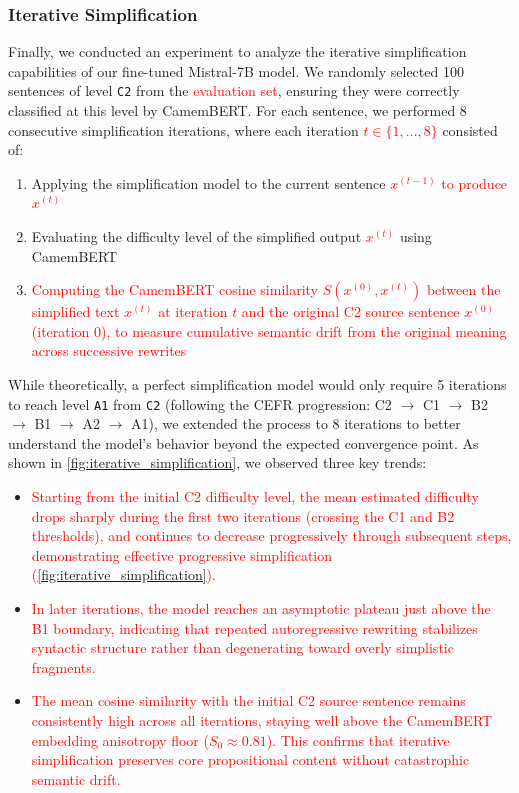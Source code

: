 \subsubsection{Iterative Simplification}

Finally, we conducted an experiment to analyze the iterative simplification capabilities of our fine-tuned Mistral-7B model. We randomly selected 100 sentences of level \texttt{C2} from the \textcolor{red}{evaluation set}, ensuring they were correctly classified at this level by CamemBERT. For each sentence, we performed 8 consecutive simplification iterations, where each iteration \textcolor{red}{$t \in \{1, \dots, 8\}$} consisted of:

\begin{enumerate}
    \item Applying the simplification model to the current sentence \textcolor{red}{$x^{(t-1)}$ to produce $x^{(t)}$}
    \item Evaluating the difficulty level of the simplified output \textcolor{red}{$x^{(t)}$} using CamemBERT
    \item \textcolor{red}{Computing the CamemBERT cosine similarity $S(x^{(0)}, x^{(t)})$ between the simplified text $x^{(t)}$ at iteration $t$ and the original C2 source sentence $x^{(0)}$ (iteration 0), to measure cumulative semantic drift from the original meaning across successive rewrites}
\end{enumerate}

While theoretically, a perfect simplification model would only require 5 iterations to reach level \texttt{A1} from \texttt{C2} (following the CEFR progression: C2 $\to$ C1 $\to$ B2 $\to$ B1 $\to$ A2 $\to$ A1), we extended the process to 8 iterations to better understand the model's behavior beyond the expected convergence point. As shown in \autoref{fig:iterative_simplification}, we observed three key trends:

\begin{itemize}
    \item \textcolor{red}{Starting from the initial C2 difficulty level, the mean estimated difficulty drops sharply during the first two iterations (crossing the C1 and B2 thresholds), and continues to decrease progressively through subsequent steps, demonstrating effective progressive simplification (\autoref{fig:iterative_simplification}).}
    \item \textcolor{red}{In later iterations, the model reaches an asymptotic plateau just above the B1 boundary, indicating that repeated autoregressive rewriting stabilizes syntactic structure rather than degenerating toward overly simplistic fragments.}
    \item \textcolor{red}{The mean cosine similarity with the initial C2 source sentence remains consistently high across all iterations, staying well above the CamemBERT embedding anisotropy floor ($S_0 \approx 0.81$). This confirms that iterative simplification preserves core propositional content without catastrophic semantic drift.}
\end{itemize}

